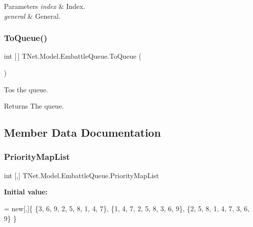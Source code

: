 \begin{DoxyParams}{Parameters}
{\em index} & Index.\\
\hline
{\em general} & General.\\
\hline
\end{DoxyParams}
\mbox{\label{class_t_net_1_1_model_1_1_embattle_queue_a99080e1068b529b10c5f699665ec2562}} 
\subsubsection{\texorpdfstring{To\+Queue()}{ToQueue()}}
{\footnotesize\ttfamily int \mbox{[}$\,$\mbox{]} T\+Net.\+Model.\+Embattle\+Queue.\+To\+Queue (\begin{DoxyParamCaption}{ }\end{DoxyParamCaption})}



Tos the queue. 

\begin{DoxyReturn}{Returns}
The queue.
\end{DoxyReturn}


\subsection{Member Data Documentation}
\mbox{\label{class_t_net_1_1_model_1_1_embattle_queue_a520353f819d01fc5c04b8f2422abdbd7}} 
\subsubsection{\texorpdfstring{Priority\+Map\+List}{PriorityMapList}}
{\footnotesize\ttfamily int \mbox{[},\mbox{]} T\+Net.\+Model.\+Embattle\+Queue.\+Priority\+Map\+List\hspace{0.3cm}{\ttfamily [static]}}

{\bfseries Initial value\+:}
\begin{DoxyCode}
= \textcolor{keyword}{new}[,]\{
            \{3, 6, 9, 2, 5, 8, 1, 4, 7\},
            \{1, 4, 7, 2, 5, 8, 3, 6, 9\},
            \{2, 5, 8, 1, 4, 7, 3, 6, 9\}
        \}
\end{DoxyCode}


